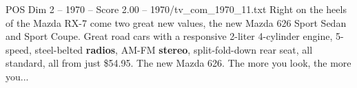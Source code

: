 \begin{textsample}{POS Dim 2 – 1970 – Score 2.00 – 1970/tv\_com\_1970\_11.txt}  \label{ex:f2_pos_052}
Right on the heels of the Mazda RX-7 come two great new values, the new Mazda 626 Sport Sedan and Sport Coupe.
Great road cars with a responsive 2-liter 4-cylinder engine, 5-speed, steel-belted \textbf{radios}, AM-FM \textbf{stereo}, split-fold-down rear seat, all standard, all from just \$54.95.
The new Mazda 626.
The more you look, the more you...

\end{textsample}
